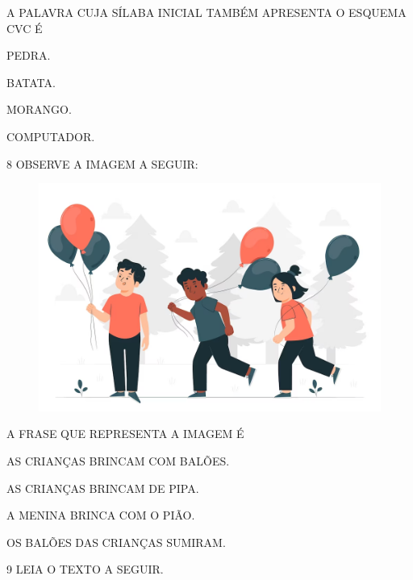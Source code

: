 A PALAVRA CUJA SÍLABA INICIAL TAMBÉM APRESENTA O ESQUEMA CVC É

\begin{multicols}{2}
\begin{escolha}
\item PEDRA.

\item BATATA.

\item MORANGO.

\item COMPUTADOR.
\end{escolha}
\end{multicols}

\num{8} OBSERVE A IMAGEM A SEGUIR:

\begin{figure}[H]
\centering
\includegraphics[width=.9\textwidth]{./media/image217.png}
\end{figure}

A FRASE QUE REPRESENTA A IMAGEM É

\begin{escolha}

\item AS CRIANÇAS BRINCAM COM BALÕES.

\item AS CRIANÇAS BRINCAM DE PIPA.

\item A MENINA BRINCA COM O PIÃO.

\item OS BALÕES DAS CRIANÇAS SUMIRAM.

\end{escolha}

\num{9} LEIA O TEXTO A SEGUIR.

